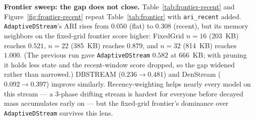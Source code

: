 \documentclass[11pt]{article}
\begin{document}
\textbf{Frontier sweep: the gap does not close.} Table~\ref{tab:frontier-recent} and Figure~\ref{fig:frontier-recent} repeat Table~\ref{tab:frontier} with \texttt{ari\_recent} added. \texttt{AdaptiveDStream}'s ARI rises from $0.050$ (flat) to $0.308$ (recent), but its memory neighbors on the fixed-grid frontier score higher: FixedGrid $n{=}16$ (203~KB) reaches $0.521$, $n{=}22$ (385~KB) reaches $0.879$, and $n{=}32$ (814~KB) reaches $1.000$. (The previous run gave \texttt{AdaptiveDStream} $0.582$ at 666~KB; with pruning it holds less state and the recent-window score dropped, so the gap widened rather than narrowed.) DBSTREAM ($0.236 \to 0.481$) and DenStream ($0.092 \to 0.397$) improve similarly. Recency-weighting helps nearly every model on this stream — a 3-phase drifting stream is hardest for everyone before decayed mass accumulates early on — but the fixed-grid frontier's dominance over \texttt{AdaptiveDStream} survives this lens.

\begin{table}[h]
\centering
\caption{Flat vs.\ recency-weighted ARI, frontier sweep (varying-density stream, $n{=}2000$, seed 7, $\lambda_{\text{eval}}=0.99$, window $=100$ points).}
\label{tab:frontier-recent}
\end{table}
\end{document}
